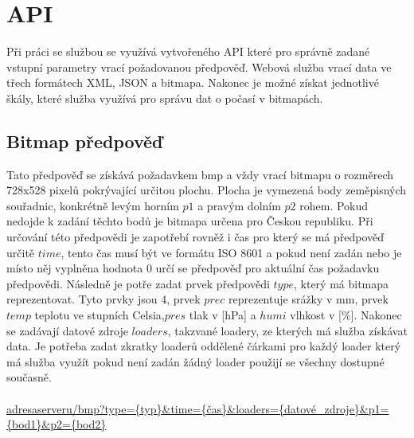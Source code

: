 \documentclass[czech,bachelor,dept460,male,csharp,cpdeclaration]{diploma}
\begin{document}
	\section{API}
	
	Při práci se službou se využívá vytvořeného API které pro správně zadané vstupní parametry vrací požadovanou předpověď. Webová služba vrací data ve třech formátech XML, JSON a bitmapa. Nakonec je možné získat jednotlivé škály, které služba využívá pro správu dat o počasí v bitmapách.
	
	\subsection{Bitmap předpověď}
	
	Tato předpověď se získává požadavkem bmp a vždy vrací bitmapu o rozměrech 728x528 pixelů pokrývající určitou plochu. Plocha je vymezená body zeměpisných souřadnic, konkrétně levým horním $p1$ a pravým dolním $p2$ rohem. Pokud nedojde k zadání těchto bodů je bitmapa určena pro Českou republiku. Při určování této předpovědi je zapotřebí rovněž i čas pro který se má předpověď určitě $time$, tento čas musí být ve formátu ISO 8601 a pokud není zadán nebo je místo něj vyplněna hodnota 0 určí se předpověď pro aktuální čas požadavku předpovědi. Následně je potře zadat prvek předpovědi $type$, který má bitmapa reprezentovat. Tyto prvky jsou 4, prvek $prec$ reprezentuje srážky v mm, prvek $temp$ teplotu ve stupních Celsia,$pres$ tlak v [hPa] a $humi$ vlhkost v [\%]. Nakonec se zadávají datové zdroje $loaders$, takzvané loadery, ze kterých má služba získávat data. Je potřeba zadat zkratky loaderů oddělené čárkami pro každý loader který má služba využít pokud není zadán žádný loader použijí se všechny dostupné současně.
	\\\\
	\url{adresaserveru/bmp?type={typ}\&time={čas}\&loaders={datové\_zdroje}\&p1={bod1}\&p2={bod2}}
	
\end{document}

